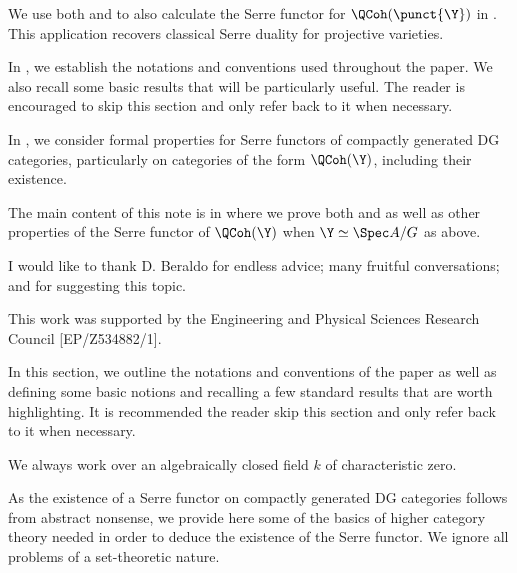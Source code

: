\documentclass{amsart}
\begin{document}
  \sssec{}

  We use both  and
   to also calculate
  the Serre functor for \(\QCoh(\punct{\Y})\) in .
  This application recovers classical Serre duality for projective
  varieties.


  In , we establish the notations
  and conventions used throughout the paper. We also
  recall some basic results that will be particularly
  useful. The reader is encouraged to skip this
  section and only refer back to it when necessary.

  In , we consider formal
  properties for Serre functors of compactly
  generated DG categories, particularly
  on categories of the form \(\QCoh(\Y)\), including their
  existence.

  The main content of this note is in 
  where we prove both  and
   as well as
  other properties of the Serre functor of \(\QCoh(\Y)\)
  when \(\Y \simeq \Spec A/G\) as above.


  I would like to thank D. Beraldo for endless advice; many fruitful
  conversations; and for suggesting this topic.

  This work was supported by the Engineering and Physical 
  Sciences Research Council [EP/Z534882/1].

  \label{sec:prelims}

  In this section, we outline the notations and conventions
  of the paper as well as defining some basic notions and
  recalling a few standard results that are worth
  highlighting. It is recommended the reader
  skip this section and only refer back to it when
  necessary.

  We always work over an algebraically closed
  field \(k\) of characteristic zero.


  As the existence of a Serre functor on compactly generated
  DG categories follows from abstract nonsense, we provide
  here some of the basics of higher category theory needed
  in order to deduce the existence of the Serre functor.
  We ignore all problems of a set-theoretic nature.

  \sssec{}
\end{document}
